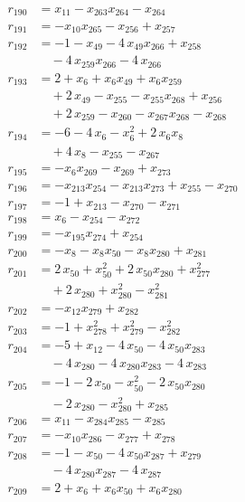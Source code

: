 \begin{align*}
r_{190} &= x_{11} - x_{263} x_{264} - x_{264} \\
r_{191} &= -x_{10} x_{265} - x_{256} + x_{257} \\
r_{192} &= -1 - x_{49} - 4\,x_{49} x_{266} + x_{258} \\
&\quad{}- 4\,x_{259} x_{266} - 4\,x_{266} \\
r_{193} &= 2 + x_{6} + x_{6} x_{49} + x_{6} x_{259} \\
&\quad{}+ 2\,x_{49} - x_{255} - x_{255} x_{268} + x_{256} \\
&\quad{}+ 2\,x_{259} - x_{260} - x_{267} x_{268} - x_{268} \\
r_{194} &= -6 - 4\,x_{6} - x_{6}^{2} + 2\,x_{6} x_{8} \\
&\quad{}+ 4\,x_{8} - x_{255} - x_{267} \\
r_{195} &= -x_{6} x_{269} - x_{269} + x_{273} \\
r_{196} &= -x_{213} x_{254} - x_{213} x_{273} + x_{255} - x_{270} \\
r_{197} &= -1 + x_{213} - x_{270} - x_{271} \\
r_{198} &= x_{6} - x_{254} - x_{272} \\
r_{199} &= -x_{195} x_{274} + x_{254} \\
r_{200} &= -x_{8} - x_{8} x_{50} - x_{8} x_{280} + x_{281} \\
r_{201} &= 2\,x_{50} + x_{50}^{2} + 2\,x_{50} x_{280} + x_{277}^{2} \\
&\quad{}+ 2\,x_{280} + x_{280}^{2} - x_{281}^{2} \\
r_{202} &= -x_{12} x_{279} + x_{282} \\
r_{203} &= -1 + x_{278}^{2} + x_{279}^{2} - x_{282}^{2} \\
r_{204} &= -5 + x_{12} - 4\,x_{50} - 4\,x_{50} x_{283} \\
&\quad{}- 4\,x_{280} - 4\,x_{280} x_{283} - 4\,x_{283} \\
r_{205} &= -1 - 2\,x_{50} - x_{50}^{2} - 2\,x_{50} x_{280} \\
&\quad{}- 2\,x_{280} - x_{280}^{2} + x_{285} \\
r_{206} &= x_{11} - x_{284} x_{285} - x_{285} \\
r_{207} &= -x_{10} x_{286} - x_{277} + x_{278} \\
r_{208} &= -1 - x_{50} - 4\,x_{50} x_{287} + x_{279} \\
&\quad{}- 4\,x_{280} x_{287} - 4\,x_{287} \\
r_{209} &= 2 + x_{6} + x_{6} x_{50} + x_{6} x_{280} \\

\end{align*}
